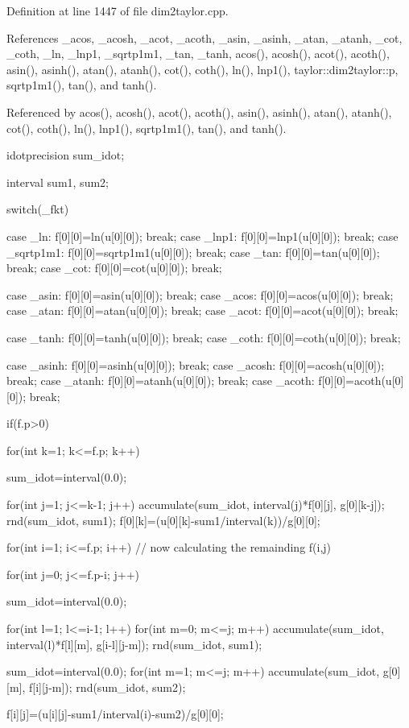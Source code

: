 \-Definition at line 1447 of file dim2taylor.\-cpp.



\-References \-\_\-acos, \-\_\-acosh, \-\_\-acot, \-\_\-acoth, \-\_\-asin, \-\_\-asinh, \-\_\-atan, \-\_\-atanh, \-\_\-cot, \-\_\-coth, \-\_\-ln, \-\_\-lnp1, \-\_\-sqrtp1m1, \-\_\-tan, \-\_\-tanh, acos(), acosh(), acot(), acoth(), asin(), asinh(), atan(), atanh(), cot(), coth(), ln(), lnp1(), taylor\-::dim2taylor\-::p, sqrtp1m1(), tan(), and tanh().



\-Referenced by acos(), acosh(), acot(), acoth(), asin(), asinh(), atan(), atanh(), cot(), coth(), ln(), lnp1(), sqrtp1m1(), tan(), and tanh().


\begin{DoxyCode}
{
 idotprecision sum_idot;

 interval sum1, sum2;
 
 switch(_fkt)   { 
   case _ln:       {f[0][0]=ln(u[0][0]);       break;}
   case _lnp1:     {f[0][0]=lnp1(u[0][0]);     break;}
   case _sqrtp1m1: {f[0][0]=sqrtp1m1(u[0][0]); break;}
   case _tan:      {f[0][0]=tan(u[0][0]);      break;}
   case _cot:      {f[0][0]=cot(u[0][0]);      break;}

   case _asin:  {f[0][0]=asin(u[0][0]);  break;}
   case _acos:  {f[0][0]=acos(u[0][0]);  break;}
   case _atan:  {f[0][0]=atan(u[0][0]);  break;}
   case _acot:  {f[0][0]=acot(u[0][0]);  break;}

   case _tanh:  {f[0][0]=tanh(u[0][0]);  break;}
   case _coth:  {f[0][0]=coth(u[0][0]);  break;}

   case _asinh:  {f[0][0]=asinh(u[0][0]);  break;}
   case _acosh:  {f[0][0]=acosh(u[0][0]);  break;}
   case _atanh:  {f[0][0]=atanh(u[0][0]);  break;}
   case _acoth:  {f[0][0]=acoth(u[0][0]);  break;}
   } 

 if(f.p>0)
   {
     for(int k=1; k<=f.p; k++)
       {
   sum_idot=interval(0.0);

   for(int j=1; j<=k-1; j++)
     {
       accumulate(sum_idot, interval(j)*f[0][j], g[0][k-j]);
     }
   rnd(sum_idot, sum1);
   f[0][k]=(u[0][k]-sum1/interval(k))/g[0][0];
       }

     for(int i=1; i<=f.p; i++) // now calculating the remainding f(i,j)
       {
   for(int j=0; j<=f.p-i; j++)
     {
       sum_idot=interval(0.0);
       
       for(int l=1; l<=i-1; l++) 
         {
     for(int m=0; m<=j; m++)
      {
      accumulate(sum_idot, interval(l)*f[l][m], g[i-l][j-m]);
      }
         }
       rnd(sum_idot, sum1); 
       
       sum_idot=interval(0.0);
       for(int m=1; m<=j; m++) 
         {
     accumulate(sum_idot, g[0][m], f[i][j-m]);
         }
       rnd(sum_idot, sum2); 
       
       f[i][j]=(u[i][j]-sum1/interval(i)-sum2)/g[0][0];
     }
       } 
   }
}
\end{DoxyCode}
